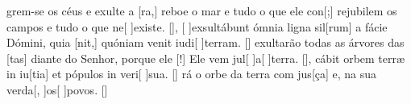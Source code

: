 {    {grem-se os céus e exulte a [ra,] reboe o mar e tudo o que ele con[;] rejubilem os campos e tudo o que ne[ ]{e}{xis}te. [\LinkPT]},
  {[ ]{ex}sultábunt ómnia ligna sil[rum] a fácie Dómini, quia [nit,] quóniam venit iudi[ ]{ter}ram. [\LinkLA]}%
    { exultarão todas as árvores das [tas] diante do Senhor, porque ele [!] Ele vem jul[ ]{a}[ ]{ter}ra. [\LinkPT]},
  {cábit orbem terræ in iu[tia] et pópulos in veri[ ]{su}a. [\LinkLA]}%
    {rá o orbe da terra com jus[ça] e, na sua verda[, ]{os}[ ]{po}vos. [\LinkPT]}
}